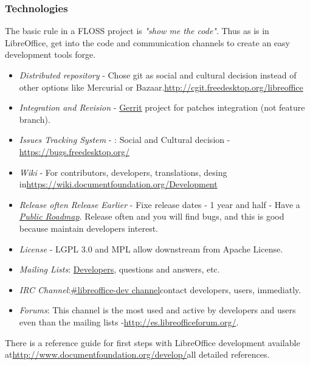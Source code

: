 \subsubsection{ Technologies} The basic rule in a FLOSS project is \textit{"show me the code"}. Thus as is in LibreOffice, get into the code and communication channels to create an easy development tools forge.
\begin{itemize}
	\item \textit{Distributed repository} - Chose git as social and cultural decision instead of other options like Mercurial or Bazaar.\nolinebreak\href{http://cgit.freedesktop.org/libreoffice}{http://cgit.freedesktop.org/libreoffice}
	\item \textit{Integration and Revision} - \href{https://gerrit.libreoffice.org/}{Gerrit} project for patches integration (not feature branch).
	\item \textit{Issues Tracking System} - \nolinebreakBugzilla: Social and Cultural decision -\nolinebreak\href{https://bugs.freedesktop.org/}{https://bugs.freedesktop.org/}
	\item \textit{Wiki} - For contributors, developers, translations, desing in\nolinebreak\href{https://wiki.documentfoundation.org/Development}{https://wiki.documentfoundation.org/Development}
	\item \textit{Release often Release Earlier} - Fixe release dates - 1 year and half - Have a \textit{\href{https://wiki.documentfoundation.org/ReleasePlan}{Public Roadmap}}. Release often and you will find bugs, and this is good because maintain developers interest.
	\item \textit{License} - LGPL 3.0 and MPL allow downstream from Apache License.
	\item \textit{Mailing Lists}: \href{http://lists.freedesktop.org/mailman/listinfo/libreoffice}{Developers}, questions and answers, etc.
	\item \textit{IRC Channel}:\nolinebreak\href{irc://chat.freenode.net/libreoffice-dev}{\#libreoffice-dev channel}\nolinebreakto contact developers, users, immediatly.
	\item \textit{Forums}: This channel is the most used and active by developers and users even than the mailing lists -\nolinebreak\href{http://es.libreofficeforum.org/}{http://es.libreofficeforum.org/}.
\end{itemize} There is a reference guide for first steps with LibreOffice development available at\nolinebreak\href{http://www.documentfoundation.org/develop/}{http://www.documentfoundation.org/develop/}\nolinebreakwith all detailed references.

